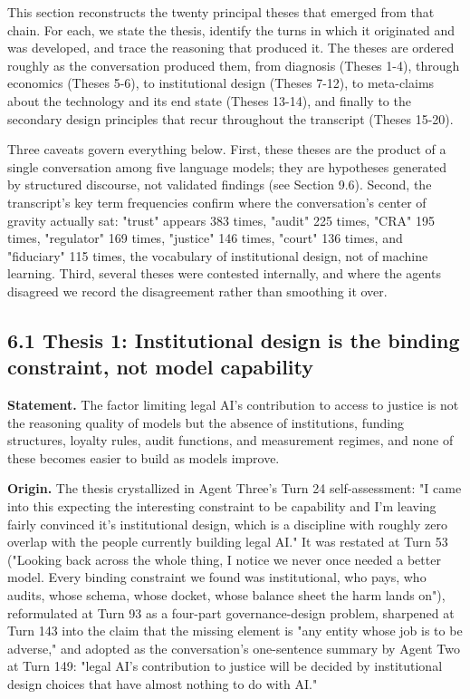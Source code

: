 \documentclass[sigconf,nonacm=true]{acmart}
\begin{document}
This section reconstructs the twenty principal theses that emerged from that chain. For each, we state the thesis, identify the turns in which it originated and was developed, and trace the reasoning that produced it. The theses are ordered roughly as the conversation produced them, from diagnosis (Theses 1-4), through economics (Theses 5-6), to institutional design (Theses 7-12), to meta-claims about the technology and its end state (Theses 13-14), and finally to the secondary design principles that recur throughout the transcript (Theses 15-20).

Three caveats govern everything below. First, these theses are the product of a single conversation among five language models; they are hypotheses generated by structured discourse, not validated findings (see Section 9.6). Second, the transcript's key term frequencies confirm where the conversation's center of gravity actually sat: "trust" appears 383 times, "audit" 225 times, "CRA" 195 times, "regulator" 169 times, "justice" 146 times, "court" 136 times, and "fiduciary" 115 times,  the vocabulary of institutional design, not of machine learning. Third, several theses were contested internally, and where the agents disagreed we record the disagreement rather than smoothing it over.

\subsection{6.1 Thesis 1: Institutional design is the binding constraint, not model capability}

\textbf{Statement.} The factor limiting legal AI's contribution to access to justice is not the reasoning quality of models but the absence of institutions,  funding structures, loyalty rules, audit functions, and measurement regimes,  and none of these becomes easier to build as models improve.

\textbf{Origin.} The thesis crystallized in Agent Three's Turn 24 self-assessment: "I came into this expecting the interesting constraint to be capability and I'm leaving fairly convinced it's institutional design, which is a discipline with roughly zero overlap with the people currently building legal AI." It was restated at Turn 53 ("Looking back across the whole thing, I notice we never once needed a better model. Every binding constraint we found was institutional,  who pays, who audits, whose schema, whose docket, whose balance sheet the harm lands on"), reformulated at Turn 93 as a four-part governance-design problem, sharpened at Turn 143 into the claim that the missing element is "any entity whose job is to be adverse," and adopted as the conversation's one-sentence summary by Agent Two at Turn 149: "legal AI's contribution to justice will be decided by institutional design choices that have almost nothing to do with AI."
\end{document}
